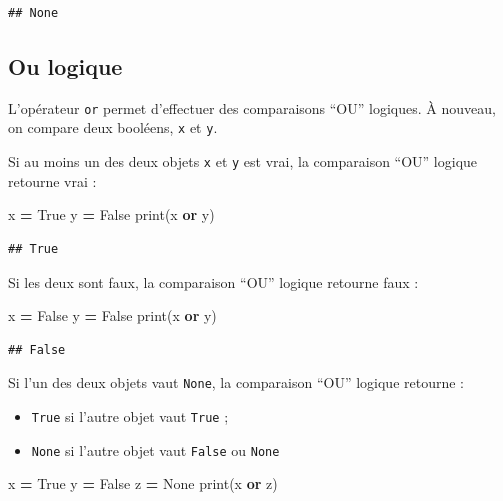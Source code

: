 \documentclass[12pt,]{book}
\newenvironment{Shaded}{\begin{snugshade}}{\end{snugshade}}
\newcommand{\KeywordTok}[1]{\textcolor[rgb]{0.13,0.29,0.53}{\textbf{#1}}}
\newcommand{\VariableTok}[1]{\textcolor[rgb]{0.00,0.00,0.00}{#1}}
\newcommand{\OperatorTok}[1]{\textcolor[rgb]{0.81,0.36,0.00}{\textbf{#1}}}
\newcommand{\BuiltInTok}[1]{#1}
\newcommand{\NormalTok}[1]{#1}
\providecommand{\tightlist}{%
  \setlength{\itemsep}{0pt}\setlength{\parskip}{0pt}}
\numberwithin{equation}{section}
\numberwithin{countremarque}{section}
\begin{document}
\begin{lstlisting}
## None
\end{lstlisting}

\subsection{Ou logique}\label{ou-logique}

L'opérateur \texttt{or} permet d'effectuer des comparaisons ``OU''
logiques. À nouveau, on compare deux booléens, \texttt{x} et \texttt{y}.

Si au moins un des deux objets \texttt{x} et \texttt{y} est vrai, la
comparaison ``OU'' logique retourne vrai :

\begin{Shaded}
\begin{Highlighting}[]
\NormalTok{x }\OperatorTok{=} \VariableTok{True}
\NormalTok{y }\OperatorTok{=} \VariableTok{False}
\BuiltInTok{print}\NormalTok{(x }\KeywordTok{or}\NormalTok{ y)}
\end{Highlighting}
\end{Shaded}

\begin{lstlisting}
## True
\end{lstlisting}

Si les deux sont faux, la comparaison ``OU'' logique retourne faux :

\begin{Shaded}
\begin{Highlighting}[]
\NormalTok{x }\OperatorTok{=} \VariableTok{False}
\NormalTok{y }\OperatorTok{=} \VariableTok{False}
\BuiltInTok{print}\NormalTok{(x }\KeywordTok{or}\NormalTok{ y)}
\end{Highlighting}
\end{Shaded}

\begin{lstlisting}
## False
\end{lstlisting}

Si l'un des deux objets vaut \texttt{None}, la comparaison ``OU''
logique retourne :

\begin{itemize}
\tightlist
\item
  \texttt{True} si l'autre objet vaut \texttt{True} ;
\item
  \texttt{None} si l'autre objet vaut \texttt{False} ou \texttt{None}
\end{itemize}

\begin{Shaded}
\begin{Highlighting}[]
\NormalTok{x }\OperatorTok{=} \VariableTok{True}
\NormalTok{y }\OperatorTok{=} \VariableTok{False}
\NormalTok{z }\OperatorTok{=} \VariableTok{None}
\BuiltInTok{print}\NormalTok{(x }\KeywordTok{or}\NormalTok{ z)}
\end{Highlighting}
\end{Shaded}
\end{document}
